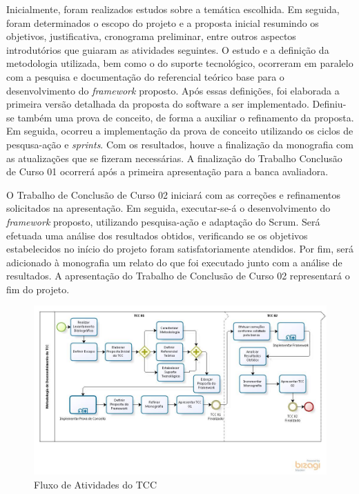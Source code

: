  \par
 \indent Inicialmente, foram realizados estudos sobre a temática escolhida. Em seguida, foram determinados o escopo do projeto e a proposta inicial resumindo os objetivos, justificativa, cronograma preliminar, entre outros aspectos introdutórios que guiaram as atividades seguintes. O estudo e a definição  da metodologia utilizada, bem como o do suporte tecnológico, ocorreram em paralelo com a pesquisa e documentação do referencial teórico base para o desenvolvimento do \textit{framework} proposto. Após essas definições, foi elaborada a primeira versão detalhada da proposta do software a ser implementado. Definiu-se também uma prova de conceito, de forma a auxiliar o refinamento da proposta. Em seguida, ocorreu a implementação da prova de conceito utilizando os ciclos de pesqusa-ação e \textit{sprints}. Com os resultados, houve a finalização da monografia com as atualizações que se fizeram necessárias. A finalização do Trabalho Conclusão de Curso 01 ocorrerá após a primeira apresentação para a banca avaliadora.
 \par
 \indent O Trabalho de Conclusão de Curso 02 iniciará com as correções e refinamentos solicitados na apresentação. Em seguida,  executar-se-á o desenvolvimento do \textit{framework} proposto, utilizando pesquisa-ação e adaptação do Scrum. Será efetuada uma análise dos resultados obtidos, verificando se os objetivos estabelecidos no início do projeto foram satisfatoriamente atendidos. Por fim, será adicionado à monografia um relato do que foi executado junto com a análise de resultados.  A apresentação do Trabalho de Conclusão de Curso 02 representará o fim do projeto.
 	
  \begin{figure}[h]
    \centering
    \includegraphics[width=\textwidth]{figuras/processo.jpg}
    \caption{Fluxo de Atividades do TCC}
    \label{fig:processo}
  \end{figure}

